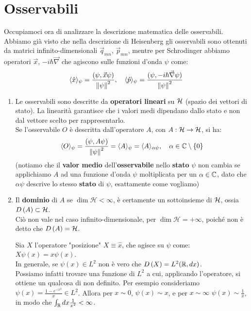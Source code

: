 \documentclass[FisicaTeorica.tex]{subfiles}
\begin{document}
\section{Osservabili}
Occupiamoci ora di analizzare la descrizione matematica delle osservabili.\\
Abbiamo già visto che nella descrizione di Heisenberg gli osservabili sono ottenuti da matrici infinito-dimensionali ${\vec{q}}_{mn}$, ${\vec{p}}_{mn}$, mentre per Schrodinger abbiamo operatori $\vec{x}$, $-i\hbar \vec{\nabla}$ che agiscono sulle funzioni d'onda $\psi$ come:
\[
\langle \hat{x}\rangle_\psi = \frac{(\psi, \vec{x}\psi)}{\left\lVert\psi\right\rVert^2}, \quad \langle \hat{p}\rangle_\psi = \frac{(\psi, -i\hbar \vec{\nabla}\psi)}{\left\lVert\psi\right\rVert^2}
\]
\begin{enumerate}
    \item Le osservabili sono descritte da \textbf{operatori lineari} su $\mathcal{H}$ (spazio dei vettori di stato). La linearità garantisce che i valori medi dipendano dallo stato e non dal vettore scelto per rappresentarlo.\\%
    Se l'osservabile $O$ è descritta dall'operatore $A$, con $A:\mathcal{H} \to \mathcal{H}$, si ha:
    \[
    \langle O \rangle_\psi = \frac{(\psi,A\psi)}{\left\lVert\psi\right\rVert^2} = \langle A \rangle_\psi = \langle A\rangle_{\alpha \psi}, \quad \alpha \in \mathbb{C}\setminus \{0\}
    \]
	(notiamo che il \textbf{valor medio} dell'\textbf{osservabile} nello \textbf{stato} $\psi$ non cambia se applichiamo $A$ ad una funzione d'onda $\psi$ moltiplicata per un $\alpha \in \mathbb{C}$, dato che $\alpha\psi$ descrive lo stesso \textbf{stato} di $\psi$, esattamente come vogliamo)
	\item Il \textbf{dominio} di $A$ se $\dim{\mathcal{H}<\infty}$, è certamente un sottoinsieme di $\mathcal{H}$, ossia $D\left(A\right)\subset \mathcal{H}$.\\
	Ciò non vale nel caso infinito-dimensionale, per $\dim{\mathcal{H}=+\infty}$, poiché non è detto che $D\left(A\right)=\mathcal{H}$.
	\begin{es} Sia $X$ l'operatore "posizione" $X\equiv \hat{x}$, che agisce su $\psi$ come: $X\psi \left(x\right)=x\psi \left(x\right)$.\\
	In generale, se $\psi \left(x\right)\in L^2$ non è vero che $D\left(X\right)=L^2(\mathbb{R}, dx)$.\\
	Possiamo infatti trovare una funzione di $L^2$ a cui, applicando l'operatore, si ottiene un qualcosa di non definito. Per esempio consideriamo $\psi \left(x\right)=\frac{1-e^{-x^2}}{x}\in L^2$. Allora per $x\sim 0$, $\psi \left(x\right)\sim x$, e per $x\sim \infty$  $\psi \left(x\right)\sim \frac{1}{x}$, in modo che $\int_{\mathbb{R}} dx \frac{1}{x^2}<\infty$.\\

\end{es}
\end{enumerate}
\end{document}
